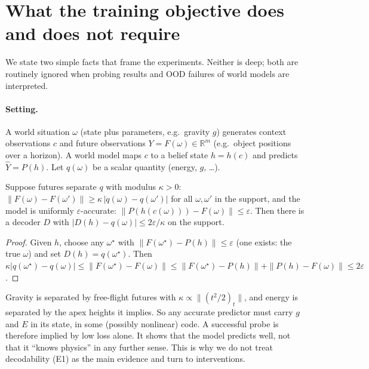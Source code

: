 \section{What the training objective does and does not require}
\label{sec:theory}

We state two simple facts that frame the experiments. Neither is deep; both are routinely ignored
when probing results and OOD failures of world models are interpreted.

\paragraph{Setting.} A world situation $\omega$ (state plus parameters, e.g.\ gravity $g$)
generates context observations $c$ and future observations $Y = F(\omega) \in \mathbb{R}^m$
(e.g.\ object positions over a horizon). A world model maps $c$ to a belief state $h = h(c)$
and predicts $\hat Y = P(h)$. Let $q(\omega)$ be a scalar quantity (energy, $g$, \dots).

\begin{proposition}
\label{prop:decode}
Suppose futures separate $q$ with modulus $\kappa > 0$:
$\|F(\omega) - F(\omega')\| \ge \kappa\, |q(\omega) - q(\omega')|$ for all $\omega, \omega'$
in the support, and the model is uniformly $\varepsilon$-accurate:
$\|P(h(c(\omega))) - F(\omega)\| \le \varepsilon$. Then there is a decoder $D$ with
$|D(h) - q(\omega)| \le 2\varepsilon/\kappa$ on the support.
\end{proposition}
\begin{proof}
Given $h$, choose any $\omega^\star$ with $\|F(\omega^\star) - P(h)\| \le \varepsilon$
(one exists: the true $\omega$) and set $D(h) = q(\omega^\star)$. Then
$\kappa |q(\omega^\star) - q(\omega)| \le \|F(\omega^\star) - F(\omega)\|
\le \|F(\omega^\star) - P(h)\| + \|P(h) - F(\omega)\| \le 2\varepsilon$.
\end{proof}
Gravity is separated by free-flight futures with
$\kappa \propto \|(t^2/2)_{t}\|$, and energy is separated by the apex heights it implies. So any
accurate predictor must carry $g$ and $E$ in its state, in some (possibly nonlinear) code. A
successful probe is therefore implied by low loss alone. It shows that the model predicts well,
not that it ``knows physics'' in any further sense. This is why we do not treat decodability
(E1) as the main evidence and turn to interventions.

